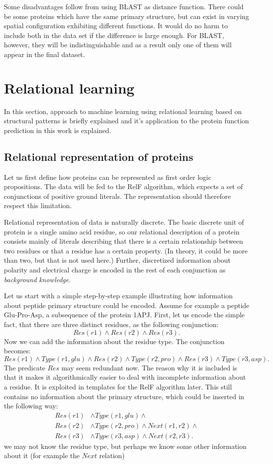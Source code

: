 \documentclass[11pt,twoside,a4paper]{book}
\begin{document}
Some disadvantages follow from using BLAST as distance function.
There could be some proteins which have the same primary structure, 
but can exist in varying spatial configuration exhibiting different functions.
It would do no harm to include both in the data set if the difference is large enough.
For BLAST, however, they will be indistinguishable and as a result 
only one of them will appear in the final dataset.

\section{Relational learning}
In this section, approach to machine learning using relational learning based on structural patterns
is briefly explained and 
it's application to the protein function prediction in this work is explained.

\subsection{Relational representation of proteins}
Let us first define how proteins can be represented as first order logic propositions.
The data will be fed to the RelF algorithm,
which expects a set of conjunctions of positive ground literals.
The representation should therefore respect this limitation.

Relational representation of data is naturally discrete.
The basic discrete unit of protein is a single amino acid residue,
so our relational description of a protein consists mainly
of literals describing that there is a certain relationship between 
two residues or that a residue has a certain property.
(In theory, it could be more than two, but that is not used here.)
Further, discretized information about polarity and electrical charge
is encoded in the rest of each conjunction as \emph{background knowledge}.

Let us start with a simple step-by-step example illustrating how information about
peptide primary structure could be encoded.
Assume for example a peptide Glu-Pro-Asp, a subsequence of the protein 1APJ.
First, let us encode the simple fact,
that there are three distinct residues, as the following conjunction:
\[ Res(r1) \land Res(r2) \land Res(r3). \]
Now we can add the information about the residue type. The conjunction becomes:
\[ Res(r1) \land Type(r1, glu) \land Res(r2) \land Type(r2, pro) \land Res(r3) \land Type(r3, asp). \]
The predicate $Res$ may seem redundant now.
The reason why it is included is that it makes it algorithmically easier to deal with incomplete information about a residue.
It is exploited in templates for the RelF algorithm later.
This still contains no information about the primary structure, 
which could be inserted in the following way:
\begin{align*}
Res(r1)& \land Type(r1, glu) \land \\
Res(r2)& \land Type(r2, pro) \land Next(r1, r2) \land \\
Res(r3)& \land Type(r3, asp) \land Next(r2, r3). 
\end{align*}
we may not know the residue type, but perhaps we know some other information about it
(for example the $Next$ relation)
\end{document}
